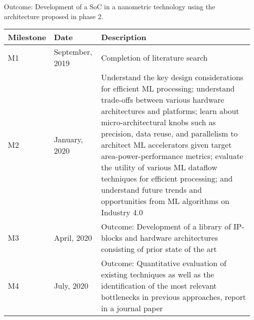 Outcome: Development of a SoC in a nanometric technology using the architecture proposed in phase 2.


	
	\begin{longtable}{|l|l|m{9cm}|}
		\hline
		\rowcolor[HTML]{C0C0C0} 
		\textbf{Milestone} & \textbf{Date}   & \textbf{Description}                                                                                                                                                                                                                                                                                                                                                                                                                                                                \\ \hline
		M1                 & September, 2019 & Completion of literature search                                                                                                                                                                                                                                                                                                                                                                                                                                                     \\ \hline
		M2                 & January, 2020   & Understand the key design considerations for efficient ML processing; understand trade-offs between various hardware architectures and platforms; learn about micro-architectural knobs such as precision, data reuse, and parallelism to architect ML accelerators given target area-power-performance metrics; evaluate the utility of various ML dataflow techniques for efficient processing; and understand future trends and opportunities from ML algorithms on Industry 4.0 \\ \hline
		M3                 & April, 2020     & Outcome: Development of a library of IP-blocks and hardware architectures consisting of prior state of the art                                                                                                                                                                                                                                                                                                                                                                      \\ \hline
		M4                 & July, 2020      & Outcome: Quantitative evaluation of existing techniques as well as the identification of the most relevant bottlenecks in previous approaches, report in a journal paper                                                                                                                                                                                                                                                                                                            \\ \hline

\end{longtable}
